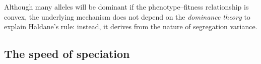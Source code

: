 \documentclass{article}
\newcommand{\plr}[1]{\todo[color=blue!25]{#1}}
\newcommand{\plr}[1]{{\color{blue}\it #1}}
\newcommand{\1}{\mathbbm{1}}
\begin{document}
Although many alleles will be dominant if the phenotype--fitness relationship is convex,
the underlying mechanism does not depend on the \emph{dominance theory} \citep{turelli1995dominance} to explain Haldane's rule:
instead, it derives from the nature of segregation variance.


\subsection*{The speed of speciation}
\end{document}
